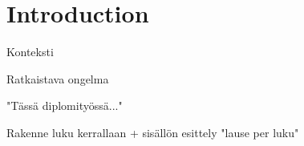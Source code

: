 
\chapter{Introduction}
 
Konteksti

Ratkaistava ongelma

"Tässä diplomityössä..."

Rakenne luku kerrallaan + sisällön esittely "lause per luku"
